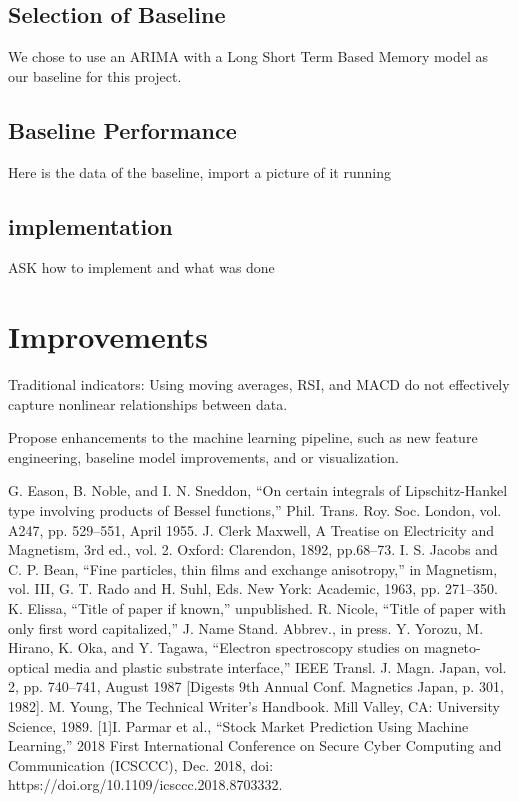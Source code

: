\documentclass[conference]{IEEEtran}
\begin{document}
\subsection{Selection of Baseline}
We chose to use an ARIMA with a Long Short Term Based Memory model as our baseline for this project.

\subsection{Baseline Performance}
Here is the data of the baseline, import a picture of it running

\subsection{implementation}
ASK how to implement and what was done

\section{Improvements}
Traditional indicators: Using moving averages, RSI, and MACD do not effectively capture nonlinear relationships between data.

Propose enhancements to the machine learning pipeline, such as new feature engineering, baseline model improvements, and or visualization.




\begin{thebibliography}{00}
 G. Eason, B. Noble, and I. N. Sneddon, ``On certain integrals of Lipschitz-Hankel type involving products of Bessel functions,'' Phil. Trans. Roy. Soc. London, vol. A247, pp. 529--551, April 1955.
 J. Clerk Maxwell, A Treatise on Electricity and Magnetism, 3rd ed., vol. 2. Oxford: Clarendon, 1892, pp.68--73.
 I. S. Jacobs and C. P. Bean, ``Fine particles, thin films and exchange anisotropy,'' in Magnetism, vol. III, G. T. Rado and H. Suhl, Eds. New York: Academic, 1963, pp. 271--350.
 K. Elissa, ``Title of paper if known,'' unpublished.
 R. Nicole, ``Title of paper with only first word capitalized,'' J. Name Stand. Abbrev., in press.
 Y. Yorozu, M. Hirano, K. Oka, and Y. Tagawa, ``Electron spectroscopy studies on magneto-optical media and plastic substrate interface,'' IEEE Transl. J. Magn. Japan, vol. 2, pp. 740--741, August 1987 [Digests 9th Annual Conf. Magnetics Japan, p. 301, 1982].
 M. Young, The Technical Writer's Handbook. Mill Valley, CA: University Science, 1989.
[1]I. Parmar et al., “Stock Market Prediction Using Machine Learning,” 2018 First International Conference on Secure Cyber Computing and Communication (ICSCCC), Dec. 2018, doi: https://doi.org/10.1109/icsccc.2018.8703332.
‌
\end{thebibliography}
\vspace{12pt}
\end{document}
